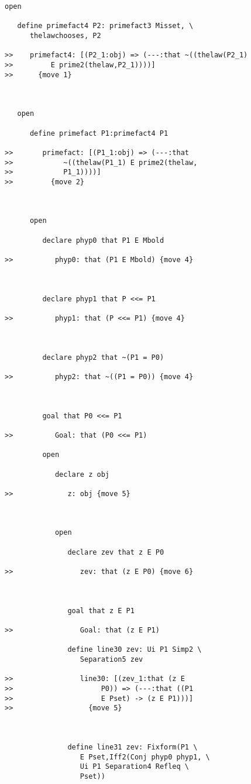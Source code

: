 \documentclass[12pt]{article}
\begin{document}
\begin{verbatim}
open

   define primefact4 P2: primefact3 Misset, \
      thelawchooses, P2

>>    primefact4: [(P2_1:obj) => (---:that ~((thelaw(P2_1)
>>         E prime2(thelaw,P2_1))))]
>>      {move 1}



   open

      define primefact P1:primefact4 P1

>>       primefact: [(P1_1:obj) => (---:that
>>            ~((thelaw(P1_1) E prime2(thelaw,
>>            P1_1))))]
>>         {move 2}



      open

         declare phyp0 that P1 E Mbold

>>          phyp0: that (P1 E Mbold) {move 4}



         declare phyp1 that P <<= P1

>>          phyp1: that (P <<= P1) {move 4}



         declare phyp2 that ~(P1 = P0)

>>          phyp2: that ~((P1 = P0)) {move 4}



         goal that P0 <<= P1

>>          Goal: that (P0 <<= P1)

         open

            declare z obj

>>             z: obj {move 5}



            open

               declare zev that z E P0

>>                zev: that (z E P0) {move 6}



               goal that z E P1

>>                Goal: that (z E P1)

               define line30 zev: Ui P1 Simp2 \
                  Separation5 zev

>>                line30: [(zev_1:that (z E
>>                     P0)) => (---:that ((P1
>>                     E Pset) -> (z E P1)))]
>>                  {move 5}



               define line31 zev: Fixform(P1 \
                  E Pset,Iff2(Conj phyp0 phyp1, \
                  Ui P1 Separation4 Refleq \
                  Pset))


\end{verbatim}
\end{document}

